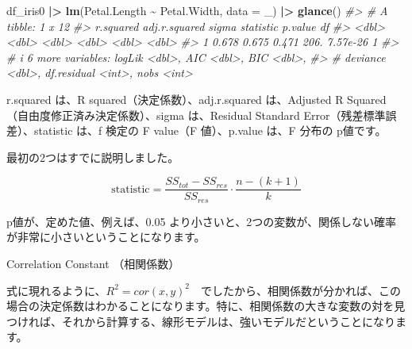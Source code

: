 \documentclass[
  xelatex, ja=standard]{bxjsbook}
\newenvironment{Shaded}{\begin{snugshade}}{\end{snugshade}}
\newcommand{\AttributeTok}[1]{\textcolor[rgb]{0.13,0.29,0.53}{#1}}
\newcommand{\CommentTok}[1]{\textcolor[rgb]{0.56,0.35,0.01}{\textit{#1}}}
\newcommand{\FunctionTok}[1]{\textcolor[rgb]{0.13,0.29,0.53}{\textbf{#1}}}
\newcommand{\NormalTok}[1]{#1}
\newcommand{\SpecialCharTok}[1]{\textcolor[rgb]{0.81,0.36,0.00}{\textbf{#1}}}
\theoremstyle{definition}
\theoremstyle{definition}
\theoremstyle{definition}
\theoremstyle{definition}
\theoremstyle{remark}
\begin{document}
\begin{Shaded}
\begin{Highlighting}[]
\NormalTok{df\_iris0 }\SpecialCharTok{|\textgreater{}} \FunctionTok{lm}\NormalTok{(Petal.Length }\SpecialCharTok{\textasciitilde{}}\NormalTok{ Petal.Width, }\AttributeTok{data =}\NormalTok{ \_) }\SpecialCharTok{|\textgreater{}} \FunctionTok{glance}\NormalTok{()}
\CommentTok{\#\textgreater{} \# A tibble: 1 x 12}
\CommentTok{\#\textgreater{}   r.squared adj.r.squared sigma statistic  p.value    df}
\CommentTok{\#\textgreater{}       \textless{}dbl\textgreater{}         \textless{}dbl\textgreater{} \textless{}dbl\textgreater{}     \textless{}dbl\textgreater{}    \textless{}dbl\textgreater{} \textless{}dbl\textgreater{}}
\CommentTok{\#\textgreater{} 1     0.678         0.675 0.471      206. 7.57e{-}26     1}
\CommentTok{\#\textgreater{} \# i 6 more variables: logLik \textless{}dbl\textgreater{}, AIC \textless{}dbl\textgreater{}, BIC \textless{}dbl\textgreater{},}
\CommentTok{\#\textgreater{} \#   deviance \textless{}dbl\textgreater{}, df.residual \textless{}int\textgreater{}, nobs \textless{}int\textgreater{}}
\end{Highlighting}
\end{Shaded}

r.squared は、R squared（決定係数）、adj.r.squared は、Adjusted R Squared（自由度修正済み決定係数）、sigma は、Residual Standard Error（残差標準誤差）、statistic は、f 検定の F value（F 値）、p.value は、F 分布の p値です。

最初の2つはすでに説明しました。

\[
\mbox{statistic} = \frac{SS_{tot} - SS_{res}}{SS_{res}}\cdot \frac{n-(k+1)}{k}
\]

p値が、定めた値、例えば、0.05 より小さいと、2つの変数が、関係しない確率が非常に小さいということになります。

Correlation Constant （相関係数）

式に現れるように、\(R^2 = cor(x,y)^2\)　でしたから、相関係数が分かれば、この場合の決定係数はわかることになります。特に、相関係数の大きな変数の対を見つければ、それから計算する、線形モデルは、強いモデルだということになります。
\end{document}
